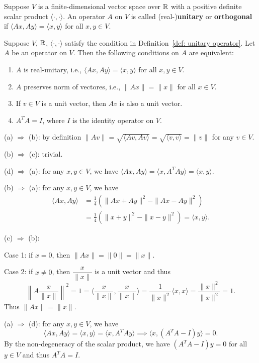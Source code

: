    \begin{definitionenv}\label{def: unitary operator}
        Suppose $V$ is a finite-dimensional vector space over $\mathbb{R}$ with a positive definite scalar product $\langle \cdot, \cdot \rangle$. An operator $A$ on $V$ is called (real-)\textbf{unitary} or \textbf{orthogonal} if $\langle A x, A y \rangle = \langle x, y \rangle$ for all $x,y \in V$.
    \end{definitionenv}
    \begin{theoremenv}
        Suppose $V$, $\mathbb{R}$, $\langle \cdot, \cdot \rangle$ satisfy the condition in Definition~\ref{def: unitary operator}. Let $A$ be an operator on $V$. Then the following conditions on $A$ are equivalent:
        \begin{enumerate}[label=(\alph*)]
            \item $A$ is real-unitary, i.e., $\langle A x, A y \rangle = \langle x, y \rangle$ for all $x,y \in V$.
            \item $A$ preserves norm of vectores, i.e., $\|A x\| = \|x\|$ for all $x \in V$.
            \item If $v\in V$ is a unit vector, then $A v$ is also a unit vector.
            \item $A^T A = I$, where $I$ is the identity operator on $V$.
        \end{enumerate}
    \end{theoremenv}
    \begin{proofenv}
        (a) $\Rightarrow$ (b): by definition $\| Av \| = \sqrt{\langle Av, Av \rangle} = \sqrt{\langle v, v \rangle} = \|v\|$ for any $v\in V$.

        (b) $\Rightarrow$ (c): trivial.

        (d) $\Rightarrow$ (a): for any $x,y \in V$, we have $\langle A x, A y \rangle = \langle x, A^T A y \rangle = \langle x, y \rangle$.

        (b) $\Rightarrow$ (a): for any $x,y \in V$, we have
        \[
        \begin{aligned}
            \langle A x, A y \rangle &= \frac14 \left( \|A x + A y\|^2 - \|A x - A y\|^2 \right)\\  &= \frac{1}{4} \left( \|x + y\|^2 - \|x - y\|^2 \right) = \langle x, y \rangle.
        \end{aligned}
        \]

        (c) $\Rightarrow$ (b): 
        
        Case 1: if $x=0$, then $\|A x\| = \|0\| = \|x\|$. 
        
        Case 2: if $x\neq 0$, then $\dfrac{x}{\|x\|}$ is a unit vector and thus
        $$ \left\| A\frac{x}{\|x\|}\right\| ^2 = 1 = \langle \frac{x}{\|x\|}, \frac{x}{\|x\|} \rangle = \frac1{\|x\|^2} \langle x, x \rangle = \frac{\|x\|^2}{\|x\|^2} = 1. $$
        Thus $\|A x\| = \|x\|$.

        (a) $\Rightarrow$ (d): for any $x,y \in V$, we have
        $$ \langle Ax, A y \rangle = \langle x,y \rangle = \langle x, A^T A y \rangle \implies \langle x, (A^T A - I) y \rangle = 0. $$
        By the non-degeneracy of the scalar product, we have $(A^T A - I) y = 0$ for all $y\in V$ and thus $A^T A = I$.
    \end{proofenv}
